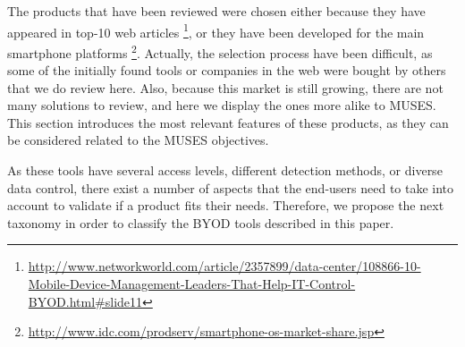 The products that have been reviewed were chosen either because they have appeared in top-10 web articles \footnote{\url{http://www.networkworld.com/article/2357899/data-center/108866-10-Mobile-Device-Management-Leaders-That-Help-IT-Control-BYOD.html#slide11}}, or they have been developed for the main smartphone platforms \footnote{\url{http://www.idc.com/prodserv/smartphone-os-market-share.jsp}}. Actually, the selection process have been difficult, as some of the initially found tools or companies in the web were bought by others that we do review here. Also, because this market is still growing, there are not many solutions to review, and here we display the ones more alike to MUSES. This section introduces the most relevant features of these products, as they can be considered related to the MUSES objectives.

As these tools have several access levels, different detection methods, or diverse data control, there exist a number of aspects that the end-users need to take into account to validate if a product fits their needs. Therefore, we propose the next taxonomy in order to classify the BYOD tools described in this paper.

